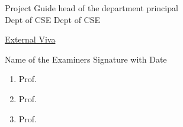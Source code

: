 \documentclass[12pt,a4paper]{report}
\begin{document}
\begin{mdframed}[linewidth=1pt]
\begin{tabbing}
\footnotesize Project Guide\>
head of the department\>
\footnotesize principal\\

\footnotesize Dept of CSE\>
\footnotesize Dept of CSE\\
\end{tabbing}

\vspace{1cm}

\center\underline{External Viva}

Name of the Examiners \hfill Signature with Date

\begin{small}
\begin{enumerate}
\item Prof.
\item Prof.
\item Prof.
\end{enumerate}
\end{small}

\end{mdframed}
\end{document}
